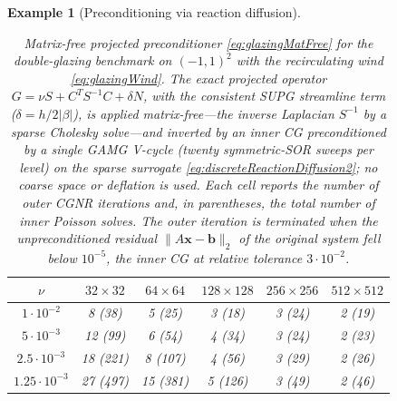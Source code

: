 \documentclass[hidelinks,onefignum,onetabnum]{siamart220329}
\newcommand{\bb}[1]{#1}
\newtheorem{example}{Example}
\let\vec\mathbf
\begin{document}
\begin{example}[Preconditioning via reaction diffusion]
    \begin{table}
        \centering
%
	\caption{\bb{Matrix-free projected preconditioner \eqref{eq:glazingMatFree} for the double-glazing benchmark on $(-1,1)^2$ with the recirculating wind \eqref{eq:glazingWind}. The exact projected operator $G=\nu S + C^{T}S^{-1}C + \delta N$, with the consistent SUPG streamline term ($\delta = h/2|\beta|$), is applied matrix-free---the inverse Laplacian $S^{-1}$ by a sparse Cholesky solve---and inverted by an inner CG preconditioned by a single GAMG V-cycle (twenty symmetric-SOR sweeps per level) on the sparse surrogate \eqref{eq:discreteReactionDiffusion2}; no coarse space or deflation is used. Each cell reports the number of outer CGNR iterations and, in parentheses, the total number of inner Poisson solves. The outer iteration is terminated when the unpreconditioned residual $\lVert A\vec{x}-\vec{b}\rVert_2$ of the original system fell below $10^{-5}$, the inner CG at relative tolerance $3\cdot 10^{-2}$.}}
        \label{tab:glazing}
        \begin{tabular}{c|c|c|c|c|c}
            \toprule
            $\nu$               & $32\times 32$ & $64\times 64$ & $128\times 128$ & $256\times 256$ & $512\times 512$ \\
            \midrule
            $1\cdot 10^{-2}$    & 8 (38)  & 5 (25)  & 3 (18)  & 3 (24) & 2 (19) \\
            $5\cdot 10^{-3}$    & 12 (99) & 6 (54)  & 4 (34)  & 3 (24) & 2 (23) \\
            $2.5\cdot 10^{-3}$  & 18 (221) & 8 (107) & 4 (56)  & 3 (29) & 2 (26) \\
            $1.25\cdot 10^{-3}$ & 27 (497) & 15 (381) & 5 (126) & 3 (49) & 2 (46) \\
            \bottomrule
        \end{tabular}
    \end{table}


\end{example}
\end{document}

